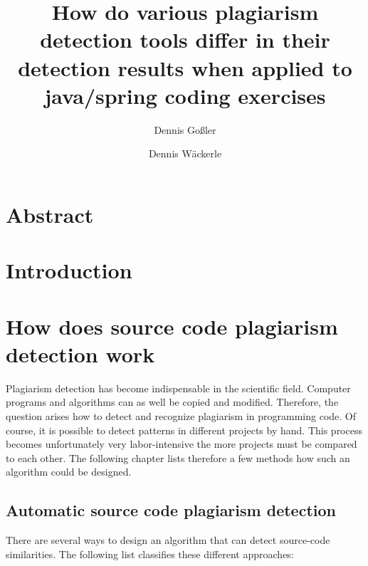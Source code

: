 \documentclass[a4paper, 11pt]{article}
\renewcommand{\\}{\vspace*{0.5\baselineskip} \newline}
\begin{document}
\title{How do various plagiarism detection tools differ in their detection results when applied to java/spring coding exercises}
\author{Dennis Goßler \and Dennis Wäckerle}
\maketitle

\section*{Abstract}
\newpage
\tableofcontents
\newpage

\section{Introduction}

\section{How does source code plagiarism detection work}

Plagiarism detection has become indispensable in the scientific field. Computer programs and algorithms can as well be copied and modified. Therefore, the question arises how to detect and recognize plagiarism in programming code. Of course, it is possible to detect patterns in different projects by hand. This process becomes unfortunately very labor-intensive the more projects must be compared to each other. The following chapter lists therefore a few methods how such an algorithm could be designed.

\subsection{Automatic source code plagiarism detection}

There are several ways to design an algorithm that can detect source-code similarities. The following list classifies these different approaches:
\end{document}
